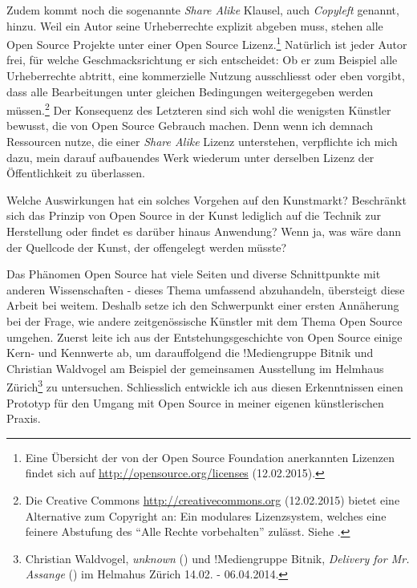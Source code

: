 \documentclass[
paper=164mm:234mm, %
pagesize, %
DIV=calc, %
10pt, %
BCOR=0mm, %
parskip=half- %
]{scrbook}
\begin{document}
Zudem kommt noch die sogenannte \emph{Share Alike} Klausel, auch \emph{Copyleft} genannt, hinzu. Weil ein Autor seine Urheberrechte explizit abgeben muss, stehen alle Open Source Projekte unter einer Open Source Lizenz.\footnote{Eine Übersicht der von der Open Source Foundation anerkannten Lizenzen findet sich auf \url{http://opensource.org/licenses} (12.02.2015).} Natürlich ist jeder Autor frei, für welche Geschmacksrichtung er sich entscheidet: Ob er zum Beispiel alle Urheberrechte abtritt, eine kommerzielle Nutzung ausschliesst oder eben vorgibt, dass alle Bearbeitungen unter gleichen Bedingungen weitergegeben werden müssen.\footnote{Die Creative Commons \url{http://creativecommons.org} (12.02.2015) bietet eine Alternative zum Copyright an: Ein modulares Lizenzsystem, welches eine feinere Abstufung des \enquote{Alle Rechte vorbehalten} zulässt. Siehe \cite[7-8]{Casserly-Ito:2011}.} Der Konsequenz des Letzteren sind sich wohl die wenigsten Künstler bewusst, die von Open Source Gebrauch machen. Denn wenn ich demnach Ressourcen nutze, die einer \emph{Share Alike} Lizenz unterstehen, verpflichte ich mich dazu, mein darauf aufbauendes Werk wiederum unter derselben Lizenz der Öffentlichkeit zu überlassen.

Welche Auswirkungen hat ein solches Vorgehen auf den Kunstmarkt? Beschränkt sich das Prinzip von Open Source in der Kunst lediglich auf die Technik zur Herstellung oder findet es darüber hinaus Anwendung? Wenn ja, was wäre dann der Quellcode der Kunst, der offengelegt werden müsste?

Das Phänomen Open Source hat viele Seiten und diverse Schnittpunkte mit anderen Wissenschaften - dieses Thema umfassend abzuhandeln, übersteigt diese Arbeit bei weitem. Deshalb setze ich den Schwerpunkt einer ersten Annäherung bei der Frage, wie andere zeitgenössische Künstler mit dem Thema Open Source umgehen. Zuerst leite ich aus der Entstehungsgeschichte von Open Source einige Kern- und Kennwerte ab, um darauffolgend die !Mediengruppe Bitnik und Christian Waldvogel am Beispiel der gemeinsamen Ausstellung im Helmhaus Zürich\footnote{Christian Waldvogel, \emph{unknown} (\cite{Waldvogel:2014}) und !Mediengruppe Bitnik, \emph{Delivery for Mr. Assange} (\cite{Ryser/MediengruppeBitnik:2014}) im Helmahus Zürich 14.02. - 06.04.2014.} zu untersuchen. Schliesslich entwickle ich aus diesen Erkenntnissen einen Prototyp für den Umgang mit Open Source in meiner eigenen künstlerischen Praxis.


{}
\end{document}
